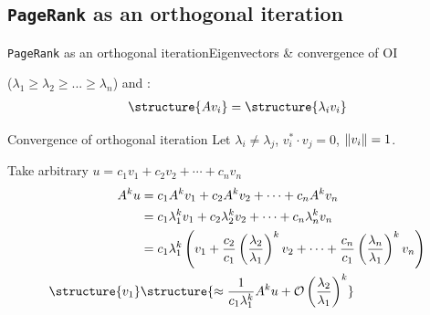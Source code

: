 \documentclass[xcolor=table,final]{beamer} %
\newcommand{\PageRank}{\texttt{PageRank}\xspace}
\begin{document}
\subsection{\PageRank as an orthogonal iteration}
\begin{frame}{\PageRank as an orthogonal iteration}{Eigenvectors \& convergence of OI}
  \begin{definition}
   ({\small $\lambda_1 \ge \lambda_2 \ge ... \ge \lambda_n$}) 
  and :%
  \begin{align*}
    \structure{A v_i} = \structure{\lambda_i v_i}
  \end{align*}
\end{definition}
\begin{block}{Convergence of orthogonal iteration}
  \small
  Let $\lambda_i \neq \lambda_j$, $v_i^*\cdot v_j = 0$, $\norm{v_i} = 1$. 

  Take arbitrary $u = c_{1}v_{1} + c_{2}v_{2} + \cdots + c_{n}v_{n}$
  \begin{align*}
    A^{k}u & =  c_{1}A^{k}v_{1} + c_{2}A^{k}v_{2} + \cdots + c_{n}A^{k}v_{n} \\ 
           & =  c_{1}\lambda_{1}^{k}v_{1} + c_{2}\lambda_{2}^{k}v_{2} + \cdots + c_{n}\lambda_{n}^{k}v_{n} \\ 
           & =  c_{1}\lambda_{1}^{k} \left( v_{1} + \frac{c_{2}}{c_{1}}\left(\frac{\lambda_{2}}{\lambda_{1}}\right)^{k}v_{2} + \cdots + \frac{c_{n}}{c_{1}}\left(\frac{\lambda_{n}}{\lambda_{1}}\right)^{k}v_{n}\right)
    \\
    \structure{v_1} &\structure{\approx \frac{1}{c_{1}\lambda_{1}^{k}} A^{k}u + {\cal O}\left(\frac{\lambda_{2}}{\lambda_{1}}\right)^{k}}
  \end{align*}
\end{block}
\end{frame}
\end{document}
